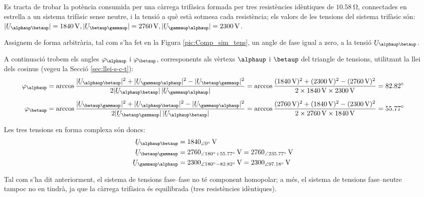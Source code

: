 \begin{exemple}
Es tracta de trobar la pot\`{e}ncia consumida per una c\`{a}rrega trif\`{a}sica
formada per tres resist\`{e}ncies id\`{e}ntiques de $\SI{10,58}{\ohm}$,
connectades en estrella a un sistema trif\`{a}sic sense neutre, i la
tensi\'{o} a qu\`{e} est\`{a} sotmesa cada resist\`{e}ncia; els valors de les
tensions del sistema trif\`{a}sic s\'{o}n: $|\cmplx{U}_{\alphaup\betaup}| =
\SI{1840}{V}, |\cmplx{U}_{\betaup\gammaup}| = \SI{2760}{V},
|\cmplx{U}_{\gammaup\alphaup}| = \SI{2300}{V}$.

Assignem de forma arbitr\`{a}ria, tal com s'ha fet en la Figura
\vref{pic:Comp_sim_tens}, un angle de fase igual a zero, a la tensi\'{o}
$\cmplx{U}_{\alphaup\betaup}$.

A continuaci\'{o} trobem els angles $\varphi_\alphaup$ i $\varphi_\betaup$,
corresponents als v\`{e}rtexs  $\alphaup$ i $\betaup$ del triangle de
tensions, utilitzant la llei dels cosinus (vegeu la Secci\'{o}
\vref{sec:llei-s-c-t}): 
\begin{align*}
    \varphi_\alphaup &= \arccos \frac{|\cmplx{U}_{\alphaup\betaup}|^2 + |\cmplx{U}_{\gammaup\alphaup}|^2 -
    |\cmplx{U}_{\betaup\gammaup}|^2}{2 |\cmplx{U}_{\alphaup\betaup}| \,|\cmplx{U}_{\gammaup\alphaup}|} =
    \arccos \frac{(\SI{1840}{V})^2 + (\SI{2300}{V})^2 - (\SI{2760}{V})^2}{2 \times \SI{1840}{V}
    \times \SI{2300}{V}} = \ang{82,82} \\[1ex]
    \varphi_\betaup &= \arccos \frac{|\cmplx{U}_{\betaup\gammaup}|^2 + |\cmplx{U}_{\alphaup\betaup}|^2 -
    |\cmplx{U}_{\gammaup\alphaup}|^2}{2 |\cmplx{U}_{\betaup\gammaup}| \,|\cmplx{U}_{\alphaup\betaup}|} =
    \arccos \frac{(\SI{2760}{V})^2 + (\SI{1840}{V})^2 - (\SI{2300}{V})^2}{2 \times \SI{2760}{V}
    \times \SI{1840}{V}} = \ang{55,77}
\end{align*}

Les tres tensions en forma complexa s\'{o}n doncs:
\begin{align*}
\cmplx{U}_{\alphaup\betaup} &= \SIpd{1840}{0}{V} \\
\cmplx{U}_{\betaup\gammaup} &= \num{2760}_{\angle\ang{180} + \ang{55,77}}\unit{V} =
\SIpd{2760}{235,77}{V} \\
\cmplx{U}_{\gammaup\alphaup} &= \num{2300}_{\angle\ang{180} - \ang{82,82}}\unit{V} = \SIpd{2300}{97,18}{V}
\end{align*}

Tal com s'ha dit anteriorment, el sistema de tensions fase--fase no
t\'{e} component homopolar; a m\'{e}s, el sistema de tensions fase--neutre
tampoc no en tindr\`{a}, ja que la c\`{a}rrega trif\`{a}sica \'{e}s equilibrada
(tres resist\`{e}ncies id\`{e}ntiques).


\end{exemple}
